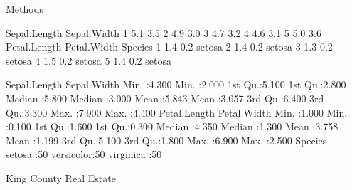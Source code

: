 \documentclass[final]{beamer}
\begin{document}
\begin{frame}[fragile]
\begin{columns}[t]
\begin{column}{0.31\linewidth}
\begin{minipage}[t][.955\textheight]{\linewidth}
\vfill%
\vspace{0ex}
\begin{block}{Methods}
\vspace{0ex}
\begin{Schunk}
\begin{Soutput}
  Sepal.Length Sepal.Width
1          5.1         3.5
2          4.9         3.0
3          4.7         3.2
4          4.6         3.1
5          5.0         3.6
  Petal.Length Petal.Width Species
1          1.4         0.2  setosa
2          1.4         0.2  setosa
3          1.3         0.2  setosa
4          1.5         0.2  setosa
5          1.4         0.2  setosa
\end{Soutput}
\begin{Soutput}
  Sepal.Length    Sepal.Width   
 Min.   :4.300   Min.   :2.000  
 1st Qu.:5.100   1st Qu.:2.800  
 Median :5.800   Median :3.000  
 Mean   :5.843   Mean   :3.057  
 3rd Qu.:6.400   3rd Qu.:3.300  
 Max.   :7.900   Max.   :4.400  
  Petal.Length    Petal.Width   
 Min.   :1.000   Min.   :0.100  
 1st Qu.:1.600   1st Qu.:0.300  
 Median :4.350   Median :1.300  
 Mean   :3.758   Mean   :1.199  
 3rd Qu.:5.100   3rd Qu.:1.800  
 Max.   :6.900   Max.   :2.500  
       Species  
 setosa    :50  
 versicolor:50  
 virginica :50  
\end{Soutput}
\end{Schunk}
\vspace{0ex}
\end{block}
\vfill

\vspace{0ex}
\begin{block}{King County Real Estate}
\vspace{0ex}
\vspace{0ex}
\end{block}
\vfill

\end{minipage}
\end{column}%

\begin{column}{0.31\linewidth}
\begin{minipage}[t][.955\textheight]{\linewidth} 


\end{minipage}
\end{column}
\end{columns}
\end{frame}
\end{document}
